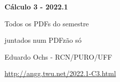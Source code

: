 \documentclass[oneside,12pt]{article}
\begin{document}

\def\u#1{\par{\footnotesize \url{#1}}}

\def\drafturl{http://angg.twu.net/LATEX/2022-1-C3.pdf}
\def\drafturl{http://angg.twu.net/2022.1-C3.html}
\def\draftfooter{\tiny \href{\drafturl}{\jobname{}} \ColorBrown{\shorttoday{} \hours}}



%

\thispagestyle{empty}

\begin{center}

\vspace*{1.2cm}

{\bf \Large Cálculo 3 - 2022.1}

\bsk

Todos os PDFs do semestre

juntados num PDFzão só

\bsk

Eduardo Ochs - RCN/PURO/UFF

\url{http://angg.twu.net/2022.1-C3.html}

\end{center}

\newpage

\def\incl#1{}


\incl{2022-1-C3-orbita}

\incl{2022-1-C3-notacao-de-fisicos}

\incl{2022-1-C3-MT1}

\incl{2022-1-C3-funcoes-homogeneas}

\incl{2022-1-C3-MT2}

\incl{2022-1-C3-P1}

\incl{2022-1-C3-P2}



\end{document}
